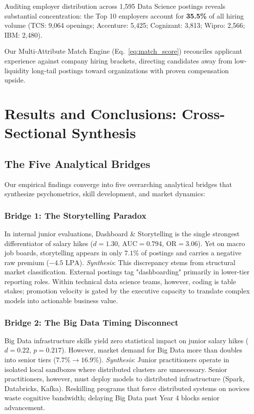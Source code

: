 \documentclass[conference]{IEEEtran}
\begin{document}
Auditing employer distribution across 1,595 Data Science postings reveals substantial concentration: the Top 10 employers account for \textbf{35.5\%} of all hiring volume (TCS: 9,064 openings; Accenture: 5,425; Cognizant: 3,813; Wipro: 2,566; IBM: 2,480).

Our Multi-Attribute Match Engine (Eq.~\ref{eq:match_score}) reconciles applicant experience against company hiring brackets, directing candidates away from low-liquidity long-tail postings toward organizations with proven compensation upside.

\section{Results and Conclusions: Cross-Sectional Synthesis}
\label{sec:results}

\subsection{The Five Analytical Bridges}

Our empirical findings converge into five overarching analytical bridges that synthesize psychometrics, skill development, and market dynamics:

\subsubsection{Bridge 1: The Storytelling Paradox}
In internal junior evaluations, Dashboard \& Storytelling is the single strongest differentiator of salary hikes ($d = 1.30$, $\text{AUC} = 0.794$, $\text{OR} = 3.06$). Yet on macro job boards, storytelling appears in only $7.1\%$ of postings and carries a negative raw premium ($-4.5\text{ LPA}$).
\textit{Synthesis}: This discrepancy stems from structural market classification. External postings tag "dashboarding" primarily in lower-tier reporting roles. Within technical data science teams, however, coding is table stakes; promotion velocity is gated by the executive capacity to translate complex models into actionable business value.

\subsubsection{Bridge 2: The Big Data Timing Disconnect}
Big Data infrastructure skills yield zero statistical impact on junior salary hikes ($d = 0.22$, $p=0.217$). However, market demand for Big Data more than doubles into senior tiers ($7.7\% \to 16.9\%$).
\textit{Synthesis}: Junior practitioners operate in isolated local sandboxes where distributed clusters are unnecessary. Senior practitioners, however, must deploy models to distributed infrastructure (Spark, Databricks, Kafka). Reskilling programs that force distributed systems on novices waste cognitive bandwidth; delaying Big Data past Year 4 blocks senior advancement.
\end{document}
